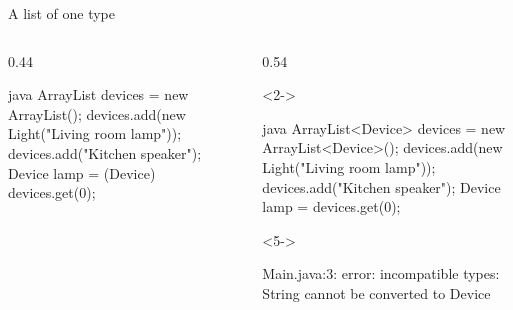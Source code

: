 \documentclass[\deckoptions]{beamer}
\begin{document}
\begin{frame}[fragile]{}{A list of one type}
  \begin{columns}[T, onlytextwidth]
    \begin{column}{0.44\textwidth}
\begin{codeblock}[steps={||none|none|none|}, dense]{java}
ArrayList devices = new ArrayList();
devices.add(new Light("Living room lamp"));
devices.add("Kitchen speaker");
Device lamp = (Device) devices.get(0);
\end{codeblock}
    \end{column}
    \begin{column}{0.54\textwidth}
      \begin{uncoverenv}<2->
\begin{codeblock}[steps={||1|4|3|}, dense, marks={1/3, 4/4, 3/5/error}]{java}
ArrayList<Device> devices = new ArrayList<Device>();
devices.add(new Light("Living room lamp"));
devices.add("Kitchen speaker");
Device lamp = devices.get(0);
\end{codeblock}
      \end{uncoverenv}
      \blockgap
      \begin{uncoverenv}<5->
\begin{consoleerror}[dense]
Main.java:3: error: incompatible types:
    String cannot be converted to Device
\end{consoleerror}
      \end{uncoverenv}
    \end{column}
  \end{columns}
  \notesgap
  \begin{codenotes}[3]
  \end{codenotes}

\end{frame}
\end{document}
